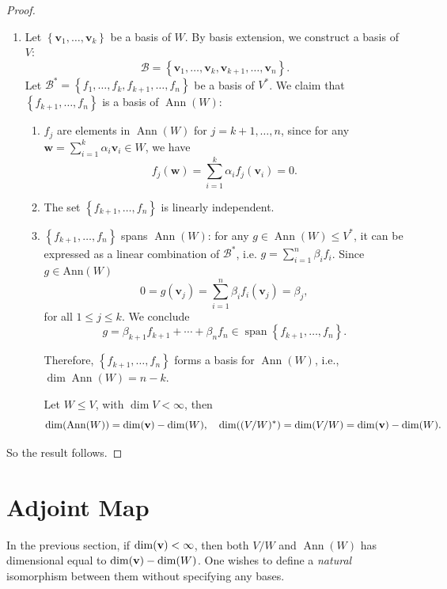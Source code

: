 \begin{proof}
\begin{enumerate}
  \item Let \(\left\{  \mathbf{v}_1,\ldots ,\mathbf{v}_{k}\right\}\) be a basis of \(W\). By basis extension, we construct a basis of \(V\):
  \[
  \mathcal{B} = \left\{  \mathbf{v}_1,\ldots ,\mathbf{v}_{k},\mathbf{v}_{k + 1},\ldots ,\mathbf{v}_n\right\}.
  \]
  Let \(\mathcal{B}^* = \left\{  f_1,\ldots ,f_{k},f_{k + 1},\ldots ,f_n\right\}\) be a basis of \(V^{ * }\). We claim that \(\left\{  f_{k + 1},\ldots ,f_n\right\}\) is a basis of \(\operatorname{Ann}\left( W\right)\):
  \begin{enumerate}
    \item \(f_{j}\) are elements in \(\operatorname{Ann}\left( W\right)\) for \(j = k + 1,\ldots ,n\), since for any \(\mathbf{w} = \sum_{i = 1}^{k}\alpha_{i}\mathbf{v}_{i} \in  W\), we have
    \[
    f_{j}\left( \mathbf{w}\right)  = \sum_{i = 1}^{k}\alpha_{i}f_{j}\left( \mathbf{v}_{i}\right) = 0.
    \]
    \item The set \(\left\{  f_{k + 1},\ldots ,f_n\right\}\) is linearly independent.
    \item \(\left\{  f_{k + 1},\ldots ,f_n\right\}\) spans \(\operatorname{Ann}\left( W\right)\): for any \(g \in  \operatorname{Ann}\left( W\right) \leq V^*\), it can be expressed as a linear combination of $\mathcal{B}^*$, i.e. \(g = \sum_{i = 1}^n\beta_{i}f_{i}\). Since $g \in \mathrm{Ann}(W)$
    \[
    0 = g\left( \mathbf{v}_j\right)  = \sum_{i = 1}^n\beta_{i}f_{i}\left( \mathbf{v}_j\right) = \beta_j,
    \]
    for all $1 \leq j \leq k$. We conclude
    \[
    g = \beta_{k + 1}f_{k + 1} + \cdots  + \beta_n f_n \in  \operatorname{span}\left\{ f_{k + 1},\ldots ,f_n \right\}.
    \]
  

  Therefore, \(\left\{  f_{k + 1},\ldots ,f_n\right\}\) forms a basis for \(\operatorname{Ann}\left( W\right)\), i.e., \(\dim \operatorname{Ann}\left( W\right)  = n - k\).

  Let \(W \leq  V\), with \(\dim V < \infty\), then
  \[
  \dim (\operatorname{Ann}(W)) = \dim ({\bf v}) - \dim (W), \quad \dim((V/W)^*) = \dim(V/W) = \dim ({\bf v}) - \dim (W).
  \]
\end{enumerate}
\end{enumerate}
So the result follows.
\end{proof}

\section{Adjoint Map}
In the previous section, if $\dim({\bf v}) < \infty$, then both
$V/W$ and $\operatorname{Ann}(W)$ has dimensional equal to $\dim({\bf v}) - \dim(W)$. One wishes to define a {\it natural} isomorphism between them without specifying any bases.

